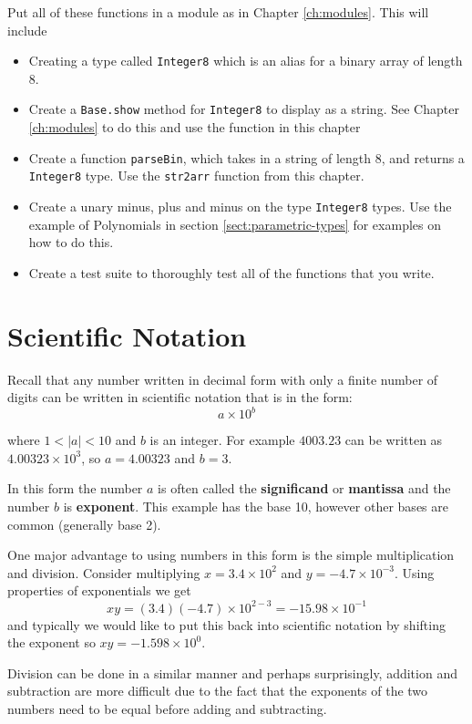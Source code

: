 Put all of these functions in a module as in Chapter \ref{ch:modules}. This will include
\begin{itemize}
\item Creating a type called \texttt{Integer8} which is an alias for a binary array of length 8.
\item Create a \verb!Base.show! method for \texttt{Integer8} to display as a string.  See Chapter \ref{ch:modules} to do this and use the function in this chapter
\item Create a function \verb!parseBin!, which takes in a string of length 8, and returns a \texttt{Integer8} type.  Use the \texttt{str2arr} function from this chapter. 
\item Create a unary minus, plus and minus on the type \texttt{Integer8} types.  Use the example of Polynomials in section \ref{sect:parametric-types} for examples on how to do this. 
\item Create a test suite to thoroughly test all of the functions that you write. 
\end{itemize}


\hypertarget{scientific-notation}{%
\section{Scientific Notation}\label{scientific-notation}}

Recall that any number written in decimal form with only a finite number
of digits can be written in scientific notation that is in the form:
\[a \times 10^{b}\]

where $1<|a|<10$ and $b$ is an integer. For example $4003.23$ can
be written as $4.00323 \times 10^{3}$, so $a=4.00323$ and $b=3$.

In this form the number $a$ is often called the \textbf{significand}
or \textbf{mantissa} and the number $b$ is \textbf{exponent}. This
example has the base 10, however other bases are common (generally base
2).

One major advantage to using numbers in this form is the simple
multiplication and division. Consider multiplying
$x=3.4 \times 10^{2}$ and $y=-4.7 \times 10^{-3}$. Using properties
of exponentials we get
\[xy = (3.4)(-4.7) \times 10^{2-3} = -15.98 \times 10^{-1}\] and
typically we would like to put this back into scientific notation by
shifting the exponent so $xy=-1.598 \times 10^{0}$.

Division can be done in a similar manner and perhaps surprisingly,
addition and subtraction are more difficult due to the fact that the
exponents of the two numbers need to be equal before adding and
subtracting.



